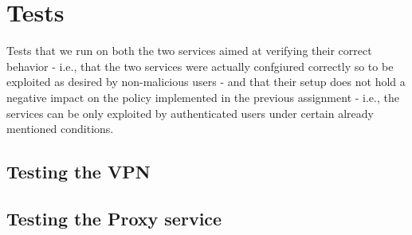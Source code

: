 \section{Tests}
Tests that we run on both the two services aimed at verifying their correct behavior - i.e., that the two services were actually confgiured correctly so to be exploited as desired by non-malicious users - and that their setup does not hold a negative impact on the policy implemented in the previous assignment - i.e., the services can be only exploited by authenticated users under certain already mentioned conditions.

\subsection{Testing the VPN}

\subsection{Testing the Proxy service}
